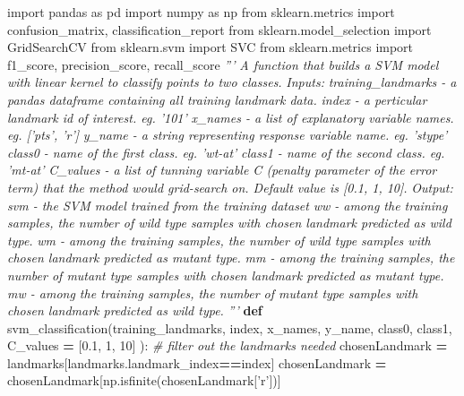 \documentclass[10pt,letterpaper]{article}
\newenvironment{Shaded}{\begin{snugshade}}{\end{snugshade}}
\newcommand{\KeywordTok}[1]{\textcolor[rgb]{0.13,0.29,0.53}{\textbf{#1}}}
\newcommand{\DecValTok}[1]{\textcolor[rgb]{0.00,0.00,0.81}{#1}}
\newcommand{\FloatTok}[1]{\textcolor[rgb]{0.00,0.00,0.81}{#1}}
\newcommand{\StringTok}[1]{\textcolor[rgb]{0.31,0.60,0.02}{#1}}
\newcommand{\ImportTok}[1]{#1}
\newcommand{\CommentTok}[1]{\textcolor[rgb]{0.56,0.35,0.01}{\textit{#1}}}
\newcommand{\OperatorTok}[1]{\textcolor[rgb]{0.81,0.36,0.00}{\textbf{#1}}}
\newcommand{\NormalTok}[1]{#1}
\begin{document}
\begin{Shaded}
\begin{Highlighting}[]
\ImportTok{import}\NormalTok{ pandas }\ImportTok{as}\NormalTok{ pd}
\ImportTok{import}\NormalTok{ numpy }\ImportTok{as}\NormalTok{ np}
\ImportTok{from}\NormalTok{ sklearn.metrics }\ImportTok{import}\NormalTok{ confusion_matrix, classification_report}
\ImportTok{from}\NormalTok{ sklearn.model_selection }\ImportTok{import}\NormalTok{ GridSearchCV}
\ImportTok{from}\NormalTok{ sklearn.svm }\ImportTok{import}\NormalTok{ SVC}
\ImportTok{from}\NormalTok{ sklearn.metrics }\ImportTok{import}\NormalTok{ f1_score, precision_score, recall_score}
\CommentTok{'''}
\CommentTok{A function that builds a SVM model with linear kernel to classify points to two classes.}
\CommentTok{Inputs:}
\CommentTok{training_landmarks - a pandas dataframe containing all training landmark data.}
\CommentTok{index              - a perticular landmark id of interest. eg. '101'}
\CommentTok{x_names            - a list of explanatory variable names. eg. ['pts', 'r']}
\CommentTok{y_name             - a string representing response variable name. eg. 'stype'}
\CommentTok{class0             - name of the first class. eg. 'wt-at'}
\CommentTok{class1             - name of the second class. eg. 'mt-at'}
\CommentTok{C_values           - a list of tunning variable C (penalty parameter of the error term) that the method would grid-search on. Default value is [0.1, 1, 10].}
\CommentTok{Output:}
\CommentTok{svm                - the SVM model trained from the training dataset}
\CommentTok{ww                 - among the training samples, the number of wild type samples with chosen landmark predicted as wild type.}
\CommentTok{wm                 - among the training samples, the number of wild type samples with chosen landmark predicted as mutant type.}
\CommentTok{mm                 - among the training samples, the number of mutant type samples with chosen landmark predicted as mutant type.}
\CommentTok{mw                 - among the training samples, the number of mutant type samples with chosen landmark predicted as wild type.}
\CommentTok{'''}
\KeywordTok{def}\NormalTok{ svm_classification(training_landmarks, index, x_names, y_name, class0, class1, C_values }\OperatorTok{=}\NormalTok{ [}\FloatTok{0.1}\NormalTok{, }\DecValTok{1}\NormalTok{, }\DecValTok{10}\NormalTok{] ):}
    \CommentTok{# filter out the landmarks needed}
\NormalTok{    chosenLandmark }\OperatorTok{=}\NormalTok{ landmarks[landmarks.landmark_index}\OperatorTok{==}\NormalTok{index]}
\NormalTok{    chosenLandmark }\OperatorTok{=}\NormalTok{ chosenLandmark[np.isfinite(chosenLandmark[}\StringTok{'r'}\NormalTok{])]}
    

\end{Highlighting}
\end{Shaded}
\end{document}

